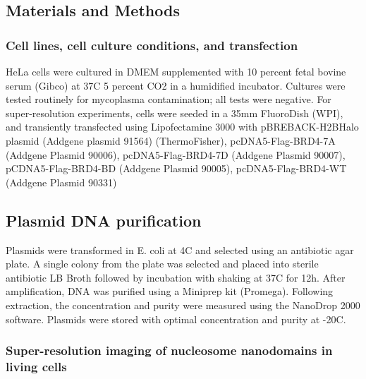 \subsection{Materials and Methods}

\subsubsection{Cell lines, cell culture conditions, and transfection}

HeLa cells were cultured in DMEM supplemented with 10 percent fetal bovine serum (Gibco) at 37C 5 percent CO2 in a humidified incubator. Cultures were tested routinely for mycoplasma contamination; all tests were negative. For super-resolution experiments, cells were seeded in a 35mm FluoroDish (WPI), and transiently transfected using Lipofectamine 3000 with pBREBACK-H2BHalo plasmid (Addgene plasmid 91564) (ThermoFisher), pcDNA5-Flag-BRD4-7A (Addgene Plasmid 90006), pcDNA5-Flag-BRD4-7D (Addgene Plasmid 90007), pCDNA5-Flag-BRD4-BD (Addgene Plasmid 90005), pcDNA5-Flag-BRD4-WT (Addgene Plasmid 90331)

\subsection{Plasmid DNA purification}

Plasmids were transformed in E. coli at 4C and selected using an antibiotic agar plate. A single colony from the plate was selected and placed into sterile antibiotic LB Broth followed by incubation with shaking at 37C for 12h. After amplification, DNA was purified using a Miniprep kit (Promega). Following extraction, the concentration and purity were measured using the NanoDrop 2000 software. Plasmids were stored with optimal concentration and purity at -20C.

\subsubsection{Super-resolution imaging of nucleosome nanodomains in living cells}

